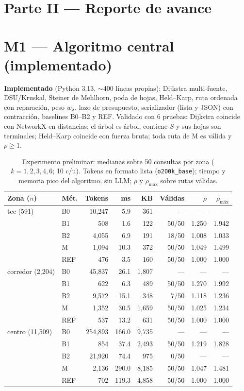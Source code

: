 \documentclass[conference,10pt]{IEEEtran}
\newcommand{\Sterm}{S}
\begin{document}
\section*{Parte II --- Reporte de avance}

\section{M1 --- Algoritmo central (implementado)}\label{sec:m1}
\textbf{Implementado} (Python 3.13, $\sim$400 líneas propias): Dijkstra multi-fuente, DSU/Kruskal, Steiner de Mehlhorn, poda de hojas, Held--Karp, ruta ordenada con reparación, peso $w_\lambda$, lazo de presupuesto, serializador (lista y JSON) con contracción, baselines B0--B2 y REF. Validado con 6 pruebas: Dijkstra coincide con NetworkX en distancias; el árbol es árbol, contiene $\Sterm$ y sus hojas son terminales; Held--Karp coincide con fuerza bruta; toda ruta de M es válida y $\rho\ge1$.

\begin{table}[t]
\caption{Experimento preliminar: medianas sobre 50 consultas por zona ($k=1,2,3,4,6$; 10 c/u). Tokens en formato lista (\texttt{o200k\_base}); tiempo y memoria pico del algoritmo, sin LLM; $\bar\rho$ y $\rho_{\text{máx}}$ sobre rutas válidas.}\label{tab:prelim}
\centering\footnotesize\setlength{\tabcolsep}{3pt}
\begin{tabular}{llrrrrrr}
\toprule
Zona ($n$) & Mét. & Tokens & ms & KB & Válidas & $\bar\rho$ & $\rho_{\text{máx}}$\\
\midrule
tec {\scriptsize(591)} & B0 & 10,247 & 5.9 & 361 & --- & --- & ---\\
 & B1 & 508 & 1.6 & 122 & 50/50 & 1.250 & 1.942\\
 & B2 & 4,055 & 6.9 & 191 & 18/50 & 1.008 & 1.033\\
 & M & 1,094 & 10.3 & 372 & 50/50 & 1.049 & 1.499\\
 & REF & 476 & 3.5 & 160 & 50/50 & 1.000 & 1.000\\
\midrule
corredor {\scriptsize(2,204)} & B0 & 45,837 & 26.1 & 1,807 & --- & --- & ---\\
 & B1 & 622 & 6.3 & 489 & 50/50 & 1.270 & 1.992\\
 & B2 & 9,572 & 15.1 & 348 & 7/50 & 1.118 & 1.236\\
 & M & 1,352 & 30.5 & 1,659 & 50/50 & 1.025 & 1.234\\
 & REF & 537 & 13.2 & 631 & 50/50 & 1.000 & 1.000\\
\midrule
centro {\scriptsize(11,509)} & B0 & 254,893 & 166.0 & 9,735 & --- & --- & ---\\
 & B1 & 854 & 37.4 & 2,493 & 50/50 & 1.219 & 1.828\\
 & B2 & 21,920 & 74.4 & 975 & 0/50 & --- & ---\\
 & M & 2,136 & 290.0 & 8,185 & 50/50 & 1.047 & 1.481\\
 & REF & 702 & 119.3 & 4,858 & 50/50 & 1.000 & 1.000\\
\bottomrule
\end{tabular}
\end{table}
\end{document}
